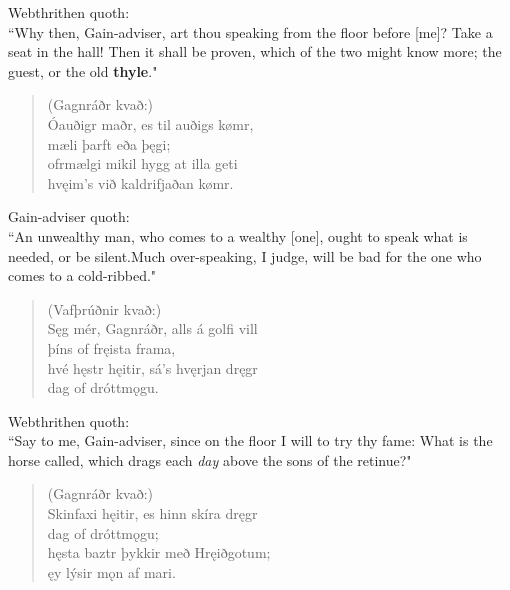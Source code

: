\bvb Webthrithen quoth: \\ “Why then, Gain-adviser, art thou speaking from the floor before [me]? Take a seat in the hall! Then it shall be proven, which of the two might know more; the guest, or the old \textbf{thyle}." \\

\begin{verse}
(Gagnráðr kvað:) \\%
\bva Óauðigr maðr, \hld es til auðigs kømr, \\%
\ind mæli þarft eða þęgi; \\%
ofrmælgi mikil \hld hygg at illa geti \\%
\ind hvęim's við kaldrifjaðan kømr.\\%
\end{verse}

\bvb Gain-adviser quoth: \\ “An unwealthy man, who comes to a wealthy [one], ought to speak what is needed, or be silent.\footnotemark[14] Much over-speaking\footnotemark[15], I judge, will be bad for the one who comes to a cold-ribbed\footnotemark[16] [man]." \\

\begin{verse}
(Vafþrúðnir kvað:) \\%
\bva Sęg mér, Gagnráðr, \hld alls á golfi vill \\%
\ind þíns of fręista frama, \\%
hvé hęstr hęitir, \hld sá's hvęrjan dręgr \\%
\ind dag of dróttmǫgu.\\%
\end{verse}

\bvb Webthrithen quoth: \\ “Say to me, Gain-adviser, since on the floor I will to try thy fame: What is the horse called, which drags each \emph{day} above the sons of the retinue\footnotemark[20]?" \\

\begin{verse}
(Gagnráðr kvað:) \\%
\bva Skinfaxi hęitir, \hld es hinn skíra dręgr \\%
\ind dag of dróttmǫgu; \\%
hęsta baztr \hld þykkir með Hręiðgotum; \\%
\ind ęy lýsir mǫn af mari.\\%
\end{verse}

